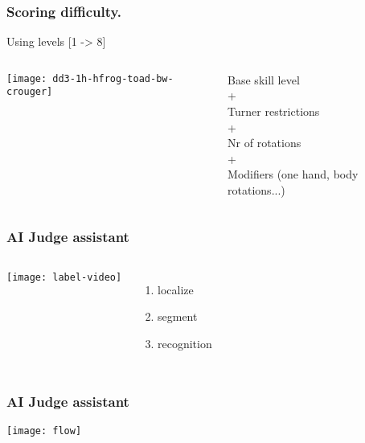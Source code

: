 \documentclass[aspectratio=169]{beamer}
\begin{document}
\begin{frame}
  \frametitle{Scoring difficulty.}
  \vspace{-0.3cm}
  Using levels [1 -> 8]
  \vspace{0.2cm}

  \begin{columns}[c]
  
    \texttt{[image: dd3-1h-hfrog-toad-bw-crouger]}

    Base skill level \\
    + \\
    Turner restrictions \\
    + \\
    Nr of rotations \\
    + \\
    Modifiers (one hand, body rotations...)

  \end{columns}
\end{frame}

\begin{frame}
  \frametitle{AI Judge assistant}

  \begin{columns}[c]
  
    \texttt{[image: label-video]}

    \begin{enumerate}
      \item localize
      \item segment
      \item recognition
    \end{enumerate}

  \end{columns}
\end{frame}

\begin{frame}
  \frametitle{AI Judge assistant}

  \texttt{[image: flow]}

\end{frame}
\end{document}
